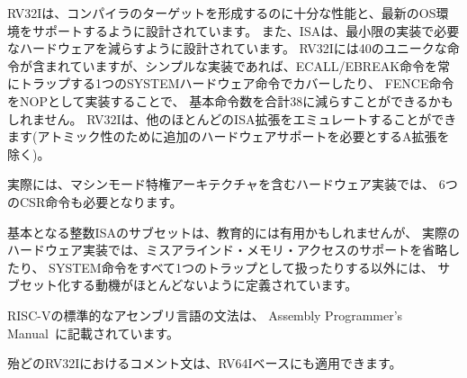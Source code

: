 \begin{commentary}
RV32Iは、コンパイラのターゲットを形成するのに十分な性能と、最新のOS環境をサポートするように設計されています。
また、ISAは、最小限の実装で必要なハードウェアを減らすように設計されています。
RV32Iには40のユニークな命令が含まれていますが、シンプルな実装であれば、ECALL/EBREAK命令を常にトラップする1つのSYSTEMハードウェア命令でカバーしたり、
FENCE命令をNOPとして実装することで、
基本命令数を合計38に減らすことができるかもしれません。
RV32Iは、他のほとんどのISA拡張をエミュレートすることができます(アトミック性のために追加のハードウェアサポートを必要とするA拡張を除く)。

実際には、マシンモード特権アーキテクチャを含むハードウェア実装では、
6つのCSR命令も必要となります。

基本となる整数ISAのサブセットは、教育的には有用かもしれませんが、
実際のハードウェア実装では、ミスアラインド・メモリ・アクセスのサポートを省略したり、
SYSTEM命令をすべて1つのトラップとして扱ったりする以外には、
サブセット化する動機がほとんどないように定義されています。
\end{commentary}

\begin{comment}
\begin{commentary}
The standard RISC-V assembly language syntax is documented in the
Assembly Programmer's Manual~\cite{riscv-asm-manual}.
\end{commentary}
\end{comment}

\begin{commentary}
RISC-Vの標準的なアセンブリ言語の文法は、
Assembly Programmer's Manual~\cite{riscv-asm-manual}に記載されています。	
\end{commentary}

\begin{comment}
\begin{commentary}
Most of the commentary for RV32I also applies to the RV64I base.
\end{commentary}
\end{comment}

\begin{commentary}
殆どのRV32Iにおけるコメント文は、RV64Iベースにも適用できます。
\end{commentary}

